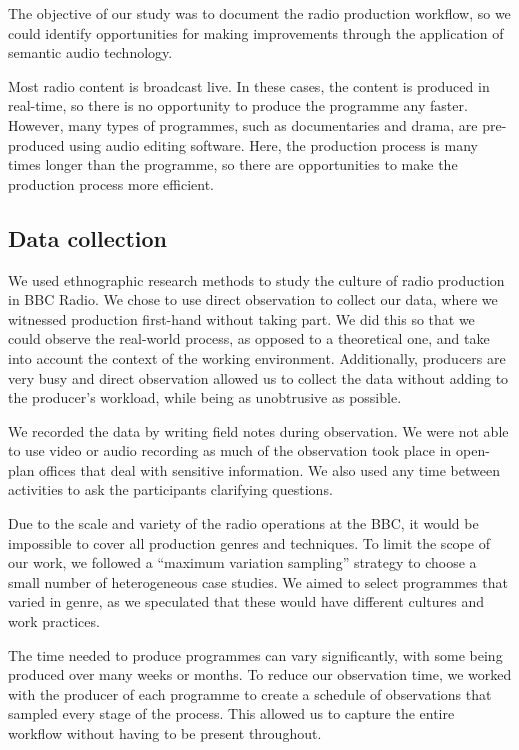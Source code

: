
The objective of our study was to document the radio production workflow, so we could identify opportunities for making improvements through the application of semantic audio technology.

Most radio content is broadcast live. In these cases, the content is produced in real-time, so there is no opportunity to produce the programme any faster. However, many types of programmes, such as documentaries and drama, are pre-produced using audio editing software. Here, the production process is many times longer than the programme, so there are opportunities to make the production process more efficient.

\subsection{Data collection}
We used ethnographic research methods to study the culture of radio production in BBC Radio. We chose to use direct observation to collect our data, where we witnessed production first-hand without taking part.
We did this so that we could observe the real-world process, as opposed to a theoretical one, and take into account the context of the working environment. Additionally, producers are very busy and direct observation allowed us to collect the data without adding to the producer's workload, while being as unobtrusive as possible.

We recorded the data by writing field notes during observation. We were not able to use video or audio recording as much of the observation took place in open-plan offices that deal with sensitive information. We also used any time between activities to ask the participants clarifying questions.

Due to the scale and variety of the radio operations at the BBC, it would be impossible to cover all production genres
and techniques. To limit the scope of our work, we followed a ``maximum variation sampling'' strategy \citep[p. 172]{Patton1990} to choose a small number of heterogeneous case studies. We aimed to select programmes that varied in genre, as we speculated that these would have different cultures and work practices.

The time needed to produce programmes can vary significantly, with some being produced over many weeks or months. To reduce our observation time, we worked with the producer of each programme to create a schedule of observations that sampled every stage of the process. This allowed us to capture the entire workflow without having to be present throughout.

